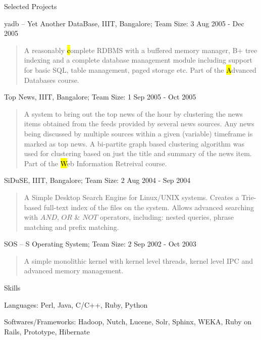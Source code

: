 \documentclass{resume}
\newcommand{\teamsize}{\sc\footnotesize Team Size: }
\begin{document}
\begin{category}{Selected Projects}{}
    \item {\topic yadb -- Yet Another DataBase,} IIIT, Bangalore;
        {\teamsize 3}
        {\period Aug 2005 - Dec 2005}
        \begin{quotation}
            A reasonably {\hl complete RDBMS} with a buffered memory manager, B+
            tree indexing and a complete database management module including
            support for basic SQL, table management, paged storage etc. Part of the
            {\hl Advanced Databases} course.
        \end{quotation}

    \item {\topic Top News,} IIIT, Bangalore;
        {\teamsize 1}
        {\period Sep 2005 - Oct 2005}
        \begin{quotation}
            A system to bring out the top news of the hour by clustering the news
            items obtained from the feeds provided by several news sources. Any
            news being discussed by multiple sources within a given (variable)
            timeframe is marked as top news. A bi-partite graph based clustering
            algorithm was used for clustering based on just the title and summary
            of the news item. Part of the {\hl Web Information Retreival} course.
        \end{quotation}

    \item {\topic SiDuSE,} IIIT, Bangalore;
        {\teamsize 2}
        {\period Aug 2004 - Sep 2004}
        \begin{quotation}
            A Simple Desktop Search Engine for Linux/UNIX systems. Creates a
            Trie-based full-text index of the files on the system. Allows advanced
            searching with $AND$, $OR$ \& $NOT$ operators, including: nested
            queries, phrase matching and prefix matching.
        \end{quotation}

    \item {\topic SOS -- S Operating System;}
        {\teamsize 2}
        {\period Sep 2002 - Oct 2003}
        \begin{quotation}
            A simple monolithic kernel with kernel level threads, kernel level IPC and advanced memory management.
        \end{quotation}

\end{category}


\begin{category}{Skills}{}

    \item {\topic Languages:} Perl, Java, C/C++, Ruby, Python

    \item {\topic Softwares/Frameworks:} Hadoop, Nutch, Lucene, Solr, Sphinx, WEKA,
    Ruby on Rails, Prototype, Hibernate

\end{category}
\end{document}
